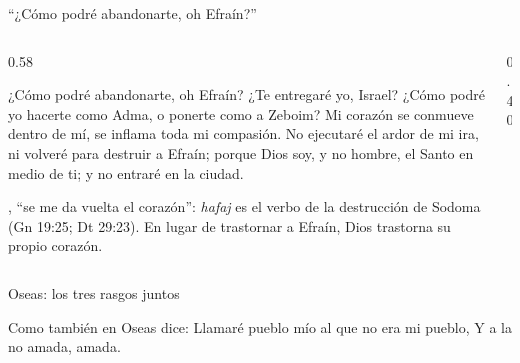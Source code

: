 \begin{frame}{``¿Cómo podré abandonarte, oh Efraín?''}
\begin{columns}[c,onlytextwidth]
\begin{column}{0.58\textwidth}
\begin{cita}¿Cómo podré abandonarte, oh Efraín? ¿Te entregaré yo, Israel? ¿Cómo podré yo hacerte como Adma, o ponerte como a Zeboim? Mi corazón se conmueve dentro de mí, se inflama toda mi compasión. No ejecutaré el ardor de mi ira, ni volveré para destruir a Efraín; porque Dios soy, y no hombre, el Santo en medio de ti; y no entraré en la ciudad.\end{cita}
\scriptsize{}, ``se me da vuelta el corazón'': \emph{hafaj} es el verbo de la destrucción de Sodoma (Gn 19:25; Dt 29:23). En lugar de trastornar a Efraín, Dios trastorna su propio corazón.\par
{}
\end{column}
\begin{column}{0.40\textwidth}\end{column}
\end{columns}
\end{frame}

\begin{frame}{Oseas: los tres rasgos juntos}
\centering
{}\par\bigskip
\begin{cita}Como también en Oseas dice: Llamaré pueblo mío al que no era mi pueblo, Y a la no amada, amada.\end{cita}
\end{frame}

